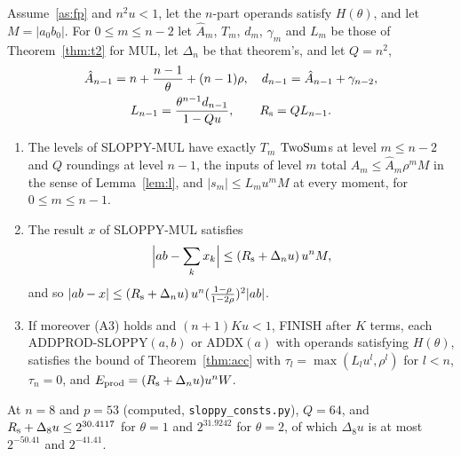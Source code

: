 \begin{theorem}\label{thm:sloppy}
Assume~\ref{as:fp} and $n^2u < 1$, let the $n$-part operands satisfy
$H(\theta)$, and let $M = |a_0b_0|$. For $0 \le m \le n-2$ let $\hat A_m$, $T_m$, $d_m$, $\gamma_m$ and $L_m$ be those
of Theorem~\ref{thm:t2} for MUL, let $\Delta_n$ be that theorem's, and let $Q = n^2$,
\begin{gather*}
\hat A_{n-1} = n + \frac{n-1}{\theta} + (n-1)\rho, \quad d_{n-1} = \hat A_{n-1} + \gamma_{n-2}, \\
L_{n-1} = \frac{\theta^{n-1}d_{n-1}}{1 - Qu}, \qquad R_{\rm s} = QL_{n-1}.
\end{gather*}
\begin{enumerate}
\item[(a)] The levels of SLOPPY-MUL have exactly $T_m$ $\mathrm{TwoSum}$s at level $m \le n-2$ and $Q$ roundings at level
  $n-1$, the inputs of level $m$ total $A_m \le \hat A_m\rho^mM$ in the sense of Lemma~\ref{lem:l}, and $|s_m| \le
  L_mu^mM$ at every moment, for $0 \le m \le n-1$.
\item[(b)] The result $x$ of SLOPPY-MUL satisfies
  \[
  \Bigl|ab - \sum_k x_k\Bigr| \le (R_{\rm s} + \Delta_nu)\,u^nM,
  \]
  and so $|ab - x| \le (R_{\rm s} + \Delta_nu)\,u^n(\frac{1-\rho}{1-2\rho})^2|ab|$.
\item[(c)] If moreover (A3) holds and $(n+1)Ku < 1$, FINISH after $K$ terms, each ADDPROD-SLOPPY$(a,
  b)$ or ADDX$(a)$ with operands satisfying $H(\theta)$, satisfies the bound of
  Theorem~\ref{thm:acc} with $\tau_l = \max(L_lu^l, \rho^l)$ for $l < n$, $\tau_n = 0$, and $E_{\rm prod} =
  (R_{\rm s} + \Delta_nu)u^nW$.
\end{enumerate}
At $n = 8$ and $p = 53$ (computed, \texttt{sloppy\_consts.py}), $Q = 64$, and $R_{\rm s} + \Delta_8u \le 2^{30.4117}$ for $\theta = 1$ and $2^{31.9242}$ for
$\theta = 2$, of which $\Delta_8u$ is at most $2^{-50.41}$ and $2^{-41.41}$.
\end{theorem}

